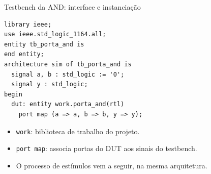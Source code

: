\begin{frame}[fragile,t]{Testbench da AND: interface e instanciação}
\begin{lstlisting}
library ieee;
use ieee.std_logic_1164.all;
entity tb_porta_and is
end entity;
architecture sim of tb_porta_and is
  signal a, b : std_logic := '0';
  signal y : std_logic;
begin
  dut: entity work.porta_and(rtl)
    port map (a => a, b => b, y => y);
\end{lstlisting}\begin{itemize}
\item \texttt{work}: biblioteca de trabalho do projeto.
\item \texttt{port map}: associa portas do DUT aos sinais do testbench.
\item O processo de estímulos vem a seguir, na mesma arquitetura.
\end{itemize}
\end{frame}
